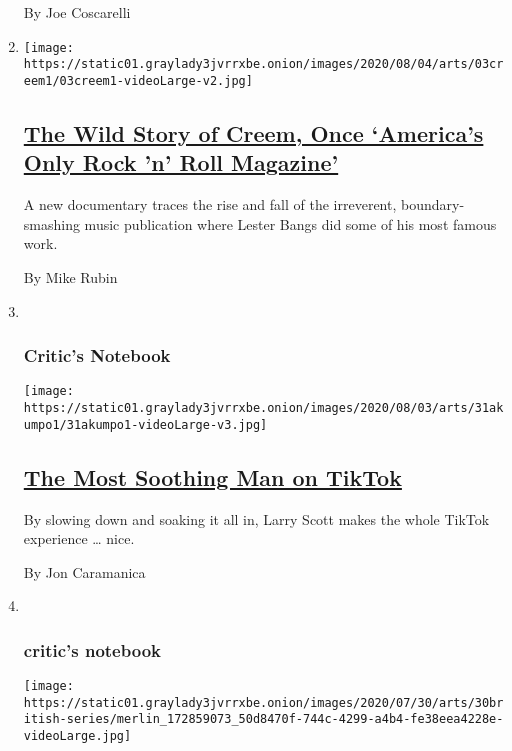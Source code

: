 \begin{enumerate}
  By Joe Coscarelli
\item
  \texttt{[image: https://static01.graylady3jvrrxbe.onion/images/2020/08/04/arts/03creem1/03creem1-videoLarge-v2.jpg]}

  \hypertarget{the-wild-story-of-creem-once-americas-only-rock-n-roll-magazine}{%
  \subsection{\texorpdfstring{\href{/2020/08/03/arts/music/creem-magazine-documentary.html}{The
  Wild Story of Creem, Once `America's Only Rock 'n' Roll
  Magazine'}}{The Wild Story of Creem, Once `America's Only Rock 'n' Roll Magazine'}}\label{the-wild-story-of-creem-once-americas-only-rock-n-roll-magazine}}

  A new documentary traces the rise and fall of the irreverent,
  boundary-smashing music publication where Lester Bangs did some of his
  most famous work.

  By Mike Rubin
\item ~
  \hypertarget{critics-notebook-1}{%
  \subsubsection{Critic's Notebook}\label{critics-notebook-1}}

  \texttt{[image: https://static01.graylady3jvrrxbe.onion/images/2020/08/03/arts/31akumpo1/31akumpo1-videoLarge-v3.jpg]}

  \hypertarget{the-most-soothing-man-on-tiktok}{%
  \subsection{\texorpdfstring{\href{/2020/07/31/arts/larry-scott-tiktok-larryakumpo.html}{The
  Most Soothing Man on
  TikTok}}{The Most Soothing Man on TikTok}}\label{the-most-soothing-man-on-tiktok}}

  By slowing down and soaking it all in, Larry Scott makes the whole
  TikTok experience \ldots{} nice.

  By Jon Caramanica
\item ~
  \hypertarget{critics-notebook-2}{%
  \subsubsection{critic's notebook}\label{critics-notebook-2}}

  \texttt{[image: https://static01.graylady3jvrrxbe.onion/images/2020/07/30/arts/30british-series/merlin\_172859073\_50d8470f-744c-4299-a4b4-fe38eea4228e-videoLarge.jpg]}


\end{enumerate}
